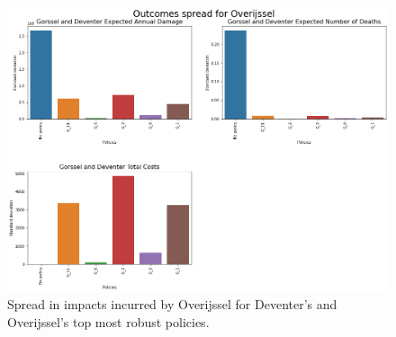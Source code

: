 \begin{figure}[h!]
    \centering
    \includegraphics[width=\textwidth]{report/figures/results/spreads/outcome_spreads_Overijssel.png}
    \caption{Spread in impacts incurred by Overijssel for Deventer's and Overijssel's top most robust policies.}
    \label{fig:impacts_over}
\end{figure}